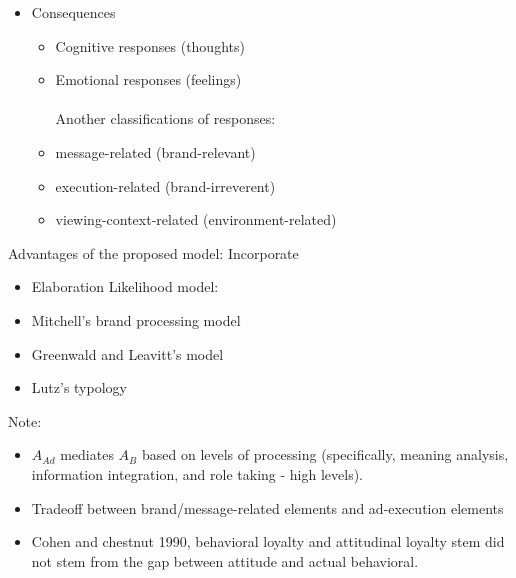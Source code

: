\documentclass[
]{book}
\providecommand{\tightlist}{%
  \setlength{\itemsep}{0pt}\setlength{\parskip}{0pt}}
\begin{document}
\begin{itemize}
\begin{itemize}
    \begin{enumerate}
    \def\labelenumi{\arabic{enumi}.}
    \item
      feature analysis: salient properties/features
    \item
      basic categorization
    \item
      meaning analysis: basic understanding
    \item
      information integration: Is this brand association?
    \item
      role-taking
    \item
      constructive processes
    \end{enumerate}
  \item
    Ability and opportunity are moderators of processing
  \end{itemize}
\item
  Consequences

  \begin{itemize}
  \item
    Cognitive responses (thoughts)
  \item
    Emotional responses (feelings)\\
    ~\\
    Another classifications of responses:
  \item
    message-related (brand-relevant)
  \item
    execution-related (brand-irreverent)
  \item
    viewing-context-related (environment-related)
  \end{itemize}
\end{itemize}

Advantages of the proposed model: Incorporate

\begin{itemize}
\item
  Elaboration Likelihood model: \citep{petty1986}
\item
  Mitchell's brand processing model
\item
  Greenwald and Leavitt's model
\item
  Lutz's typology
\end{itemize}

Note:

\begin{itemize}
\tightlist
\item
  \(A_{Ad}\) mediates \(A_B\) based on levels of processing (specifically, meaning analysis, information integration, and role taking - high levels).
\item
  Tradeoff between brand/message-related elements and ad-execution elements
\item
  Cohen and chestnut 1990, behavioral loyalty and attitudinal loyalty stem did not stem from the gap between attitude and actual behavioral.
\end{itemize}
\end{document}
